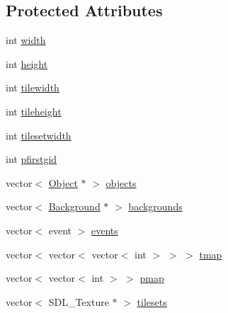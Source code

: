 \subsection*{Protected Attributes}
\begin{DoxyCompactItemize}
\item 
int \hyperlink{class_room_a0c68c6762e7d93eb459ba552dadaf308}{width}
\item 
int \hyperlink{class_room_ab7d56b80d9eeefca79a2e83447ad4d66}{height}
\item 
int \hyperlink{class_room_a1ee2ea2d741c7196d7d2fd37ae741042}{tilewidth}
\item 
int \hyperlink{class_room_ae7a9ba3c048cd82f2335f8da3e7dbe17}{tileheight}
\item 
int \hyperlink{class_room_a4664e77f8780c752449b57f2d603be5c}{tilesetwidth}
\item 
int \hyperlink{class_room_ac6125cd56db3bf38d2f44158159b3899}{pfirstgid}
\item 
vector$<$ \hyperlink{class_object}{Object} $\ast$ $>$ \hyperlink{class_room_a6495b4a5cd0ea4979fcfbbb27c6b419e}{objects}
\item 
vector$<$ \hyperlink{class_background}{Background} $\ast$ $>$ \hyperlink{class_room_a2fc816969da445fc7f0bbb3ff7a5ca9f}{backgrounds}
\item 
vector$<$ event $>$ \hyperlink{class_room_a881d5a108a9a3aba5f44279ebbd8a4f9}{events}
\item 
vector$<$ vector$<$ vector$<$ int $>$ $>$ $>$ \hyperlink{class_room_aba520dbf1dd1907f5cdcbc8b6372ec53}{tmap}
\item 
vector$<$ vector$<$ int $>$ $>$ \hyperlink{class_room_a37b095fddfc6230033ed1de7afd9ec8d}{pmap}
\item 
vector$<$ S\-D\-L\-\_\-\-Texture $\ast$ $>$ \hyperlink{class_room_a9ad1d805bf9c69b138a66b3f64adf88d}{tilesets}
\end{DoxyCompactItemize}
